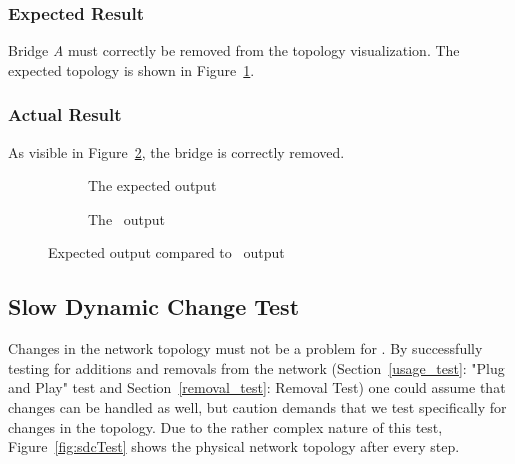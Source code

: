 \subsubsection*{Expected Result}
Bridge \textit{A} must correctly be removed from the topology visualization.
The expected topology is shown in Figure~\ref{fig:removalExp}.

\subsubsection*{Actual Result}
As visible in Figure~\ref{fig:removal}, the bridge is correctly removed.
\begin{figure}[h]
    \begin{subfigure}[b]{\textwidth}
        \centering
        \caption{The expected output}
        \label{fig:removalExp}
    \end{subfigure}

    \vspace{0.5cm}

    \begin{subfigure}[b]{\textwidth}
        \centering
        \caption{The \tool\ output}
    \end{subfigure}
    \caption{Expected output compared to \tool\ output}
    \label{fig:removal}
\end{figure}

\subsection*{Slow Dynamic Change Test}
\label{slow_dynamic_test}
Changes in the network topology must not be a problem for \tool.
By successfully testing for additions and removals from the network (Section~\ref{usage_test}: "Plug and Play" test and Section~\ref{removal_test}: Removal Test) one could assume that changes can be handled as well, but caution demands that we test specifically for changes in the topology.
Due to the rather complex nature of this test, Figure~\ref{fig:sdcTest} shows the physical network topology after every step.


